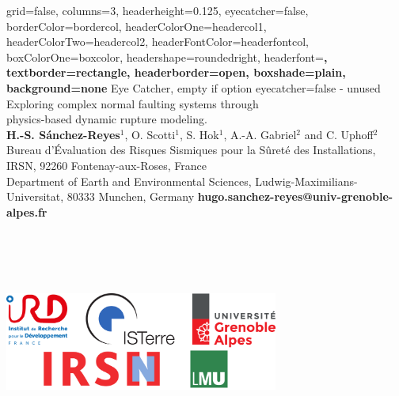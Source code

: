 


	

\color{standardfontcolor}

\begin{poster}{
		grid=false,
		columns=3,
		headerheight=0.125\textheight,
		eyecatcher=false,
        borderColor=bordercol,
		headerColorOne=headercol1,
		headerColorTwo=headercol2,
		headerFontColor=headerfontcol,
		boxColorOne=boxcolor,
		headershape=roundedright,
		headerfont=\sffamily\bfseries\Large,
		textborder=rectangle,
		headerborder=open,
		boxshade=plain,
		background=none
	}
	{
		Eye Catcher, empty if option eyecatcher=false - unused
	}
%
{
	\textsf %
	{\vskip 2.0cm Exploring complex normal faulting systems through \\ physics-based dynamic rupture modeling.}
}
{\sf\vspace{-0.1em}\\
	{\textbf{H.-S. S\'anchez-Reyes$^1$}, O. Scotti$^1$, S. Hok$^1$, A.-A. Gabriel$^2$ and C. Uphoff$^2$}
	\vspace{0.2em}\\
	\normalsize{Bureau d’Évaluation des Risques Sismiques pour la Sûreté des Installations, IRSN, 92260 Fontenay-aux-Roses, France
	\vspace{0.1em}\\
	Department of Earth and Environmental Sciences, Ludwig-Maximilians-Universitat, 80333 Munchen, Germany	 	
	\hskip 1.7cm \textbf{\normalsize \Letter} \textbf{hugo.sanchez-reyes@univ-grenoble-alpes.fr}
	} \\ \\ \\ \\ \\ 
}
{ \begin{minipage}{2cm}
  \vskip -0cm \hskip -7.3cm \includegraphics[width=9cm]{../../logos/logo_poster_2022.png}
 \end{minipage}
 }
%





\end{poster}
